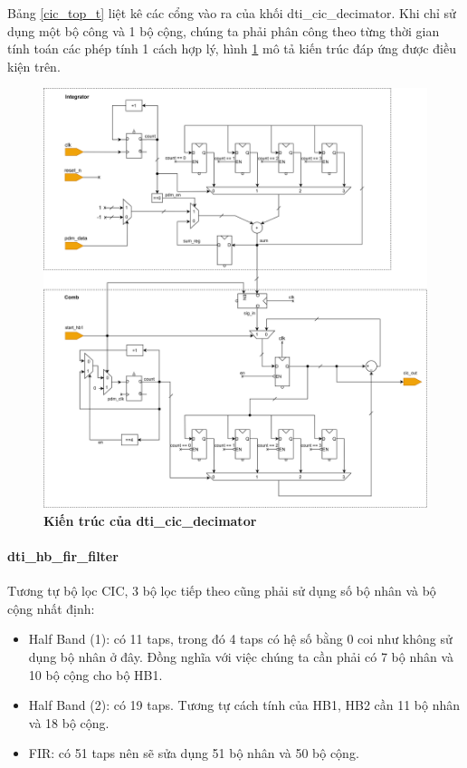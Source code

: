 Bảng \ref{cic_top_t} liệt kê các cổng vào ra của khối dti\_cic\_decimator. Khi chỉ sử dụng một bộ công và 1 bộ cộng, chúng ta phải phân công theo từng thời gian tính toán các phép tính 1 cách hợp lý, hình \ref{cic_top_arc} mô tả kiến trúc đáp ứng được điều kiện trên.

\begin{figure}[H]
    \centering
    \includegraphics[width=16cm]{Images/Chuong4/cic/cic_top_arc.png}
    \caption[Kiến trúc của dti\_cic\_decimator]{\bfseries \fontsize{12pt}{0pt}\selectfont Kiến trúc của dti\_cic\_decimator}
    \label{cic_top_arc}
\end{figure}
 \paragraph{dti\_hb\_fir\_filter}
Tương tự bộ lọc CIC, 3 bộ lọc tiếp theo cũng phải sử dụng số bộ nhân và bộ cộng nhất định:
\begin{itemize}
    \item Half Band (1): có 11 taps, trong đó 4 taps có hệ số bằng 0 coi như không sử dụng bộ nhân ở đây. Đồng nghĩa với việc chúng ta cần phải có 7 bộ nhân và 10 bộ cộng cho bộ HB1.
     \item Half Band (2): có 19 taps. Tương tự cách tính của HB1, HB2 cần 11 bộ nhân và 18 bộ cộng.
     \item FIR: có 51 taps nên sẽ sửa dụng 51 bộ nhân và 50 bộ cộng.
\end{itemize} 

